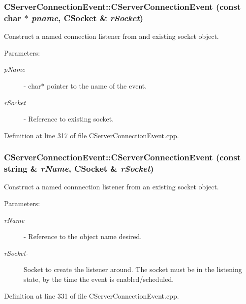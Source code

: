\subsubsection{\setlength{\rightskip}{0pt plus 5cm}CServer\-Connection\-Event::CServer\-Connection\-Event (const char $\ast$ {\em pname}, {\bf CSocket} \& {\em r\-Socket})}\label{classCServerConnectionEvent_a1}


Construct a named connection listener from and existing socket object.\begin{Desc}
\item[Parameters: ]\par
\begin{description}
\item[{\em 
p\-Name}]- char$\ast$ pointer to the name of the event. \item[{\em 
r\-Socket}]- Reference to existing socket. \end{description}
\end{Desc}


Definition at line 317 of file CServer\-Connection\-Event.cpp.
\subsubsection{\setlength{\rightskip}{0pt plus 5cm}CServer\-Connection\-Event::CServer\-Connection\-Event (const string \& {\em r\-Name}, {\bf CSocket} \& {\em r\-Socket})}\label{classCServerConnectionEvent_a2}


Construct a named connnection listener from an existing socket object.\begin{Desc}
\item[Parameters: ]\par
\begin{description}
\item[{\em 
r\-Name}]- Reference to the object name desired. \item[{\em 
r\-Socket-}]Socket to create the listener around. The socket must be in the listening state, by the time the event is enabled/scheduled. \end{description}
\end{Desc}


Definition at line 331 of file CServer\-Connection\-Event.cpp.
